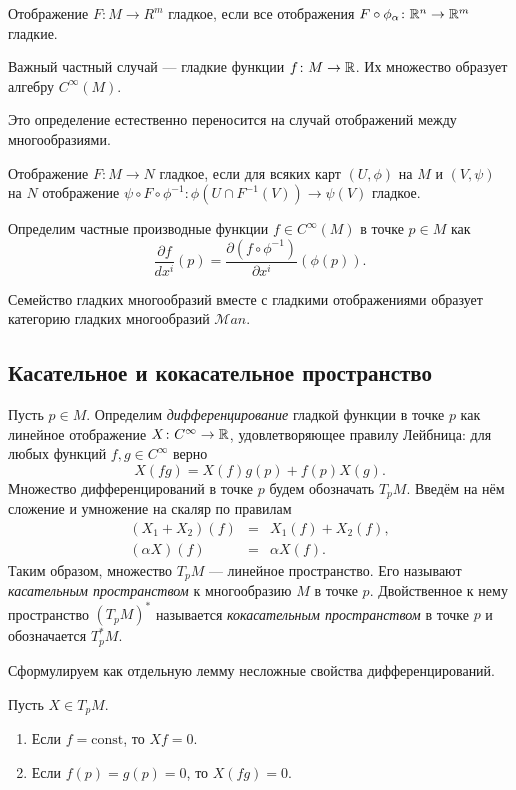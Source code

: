 \begin{defin}
	Отображение $F\colon M\to R^m$ гладкое, если все отображения $F\circ\phi_{\alpha}\colon\mathbb {R}^n\to\mathbb {R}^m$ гладкие.
\end{defin}
Важный частный случай --- гладкие функции $f\colon M\to\mathbb {R}$. Их множество образует алгебру $C^{\infty}(M)$.

Это определение естественно переносится на случай отображений между многообразиями.
\begin{defin}
	Отображение $F\colon M\to N$ гладкое, если для всяких карт $(U,\phi)$ на $M$ и $(V,\psi)$ на $N$ отображение $\psi\circ F\circ\phi^{-1}\colon \phi(U\cap F^{-1}(V))\to\psi(V)$ гладкое. 
\end{defin}

Определим частные производные функции $f\in C^{\infty}(M)$ в точке $p\in M$ как
\begin{equation}
 	\frac{\partial f}{dx^i}(p)=\frac{\partial(f\circ\phi^{-1})}{\partial x^i}(\phi(p)).
\end{equation}

Семейство гладких многообразий вместе с гладкими отображениями образует категорию гладких многообразий $\mathcal{M}an$.

\subsection{Касательное и кокасательное пространство}
Пусть $p\in M$. Определим \textit{дифференцирование} гладкой функции в точке $p$ как линейное отображение $X\colon C^{\infty}\to\mathbb {R}$, удовлетворяющее правилу Лейбница: для любых функций $f,g\in C^{\infty}$ верно
\begin{equation*}
	X(fg)=X(f)g(p)+f(p)X(g).
\end{equation*}
Множество дифференцирований в точке $p$ будем обозначать $T_pM$. Введём на нём сложение и умножение на скаляр по правилам
\begin{eqnarray*}
	(X_1+X_2)(f)&=&X_1(f)+X_2(f),\\
	(\alpha X)(f)&=&\alpha X(f).
\end{eqnarray*}	
Таким образом, множество $T_pM$ --- линейное пространство. Его называют \textit{касательным пространством} к многообразию $M$ в точке $p$. Двойственное к нему пространство $(T_pM)^*$ называется \textit{кокасательным пространством} в точке $p$ и обозначается $T^*_pM$.

Сформулируем как отдельную лемму несложные свойства дифференцирований.
\begin{lem}
	Пусть $X\in T_pM$.
	\begin{enumerate}
		\item Если $f=\mathrm{const}$, то $Xf=0$.
		\item Если $f(p)=g(p)=0$, то $X(fg)=0$.
	\end{enumerate}
\end{lem}


